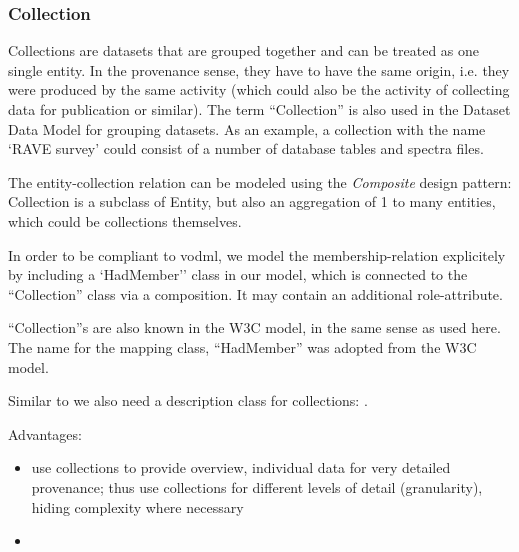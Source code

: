 \subsubsection{Collection}
Collections are datasets that are grouped together and can be treated as one single entity. 
In the provenance sense, they have to have the same origin, i.e. they were 
produced by the same activity (which could also be the activity of collecting
data for publication or similar). The term ``Collection'' is 
also used in the Dataset Data Model for grouping datasets. As an example, a collection 
with the name `RAVE survey' could consist of a number of database tables and spectra files.

The entity-collection relation can be modeled using the \emph{Composite} design pattern: 
Collection is a subclass of Entity, but also an aggregation of 1 to many entities, 
which could be collections themselves. 

In order to be compliant to vodml, we model the membership-relation explicitely 
by including a `HadMember'' class in our model, which is connected to the
``Collection'' class via a composition. It may contain an additional role-attribute.

``Collection''s are also known in the W3C model, in the same sense as used here. 
The name for the mapping class, ``HadMember'' was adopted from the W3C model.


Similar to  we also need a description class for collections: 
. 


Advantages:
\begin{itemize}
\item use collections to provide overview, individual data for very detailed provenance; 
	  thus use collections for different levels of detail (granularity), hiding 
	  complexity where necessary
\item {}
\end{itemize}








